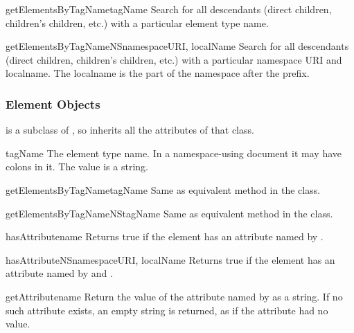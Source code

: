 \begin{methoddesc}[Document]{getElementsByTagName}{tagName}
Search for all descendants (direct children, children's children,
etc.) with a particular element type name.
\end{methoddesc}

\begin{methoddesc}[Document]{getElementsByTagNameNS}{namespaceURI, localName}
Search for all descendants (direct children, children's children,
etc.) with a particular namespace URI and localname.  The localname is
the part of the namespace after the prefix.
\end{methoddesc}


\subsubsection{Element Objects \label{dom-element-objects}}

 is a subclass of , so inherits all the
attributes of that class.

\begin{memberdesc}[Element]{tagName}
The element type name.  In a namespace-using document it may have
colons in it.  The value is a string.
\end{memberdesc}

\begin{methoddesc}[Element]{getElementsByTagName}{tagName}
Same as equivalent method in the  class.
\end{methoddesc}

\begin{methoddesc}[Element]{getElementsByTagNameNS}{tagName}
Same as equivalent method in the  class.
\end{methoddesc}

\begin{methoddesc}[Element]{hasAttribute}{name}
Returns true if the element has an attribute named by .
\end{methoddesc}

\begin{methoddesc}[Element]{hasAttributeNS}{namespaceURI, localName}
Returns true if the element has an attribute named by
 and .
\end{methoddesc}

\begin{methoddesc}[Element]{getAttribute}{name}
Return the value of the attribute named by  as a
string. If no such attribute exists, an empty string is returned,
as if the attribute had no value.
\end{methoddesc}

